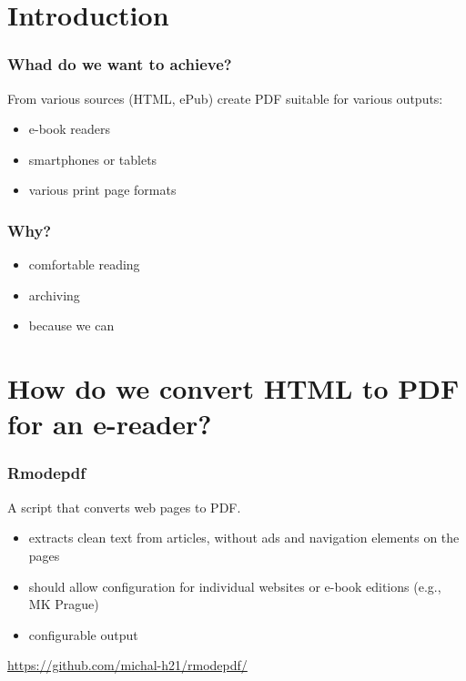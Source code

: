 \mode*
\section{Introduction}
\frenchspacing

\begin{frame}
  \frametitle{Whad do we want to achieve?}
    From various sources (HTML, ePub) create PDF suitable for various outputs:
    \begin{itemize}
      \item e-book readers
      \item smartphones or tablets
      \item various print page formats
    \end{itemize}

  \end{frame}
  \begin{frame}
    \frametitle{Why?}

    \begin{itemize}
      \item comfortable reading
      \item archiving
      \item because we can
    \end{itemize}


\end{frame}

\section{How do we convert HTML to PDF for an e-reader?}

\begin{frame}
  \frametitle{Rmodepdf}

  A script that converts  web pages to PDF.

  \begin{itemize}
    \item extracts clean text from articles, without ads and navigation elements on the pages
    \item should allow configuration for individual websites or e-book editions (e.g., MK Prague)
    \item configurable output
  \end{itemize}


  \url{https://github.com/michal-h21/rmodepdf/}
\end{frame}

